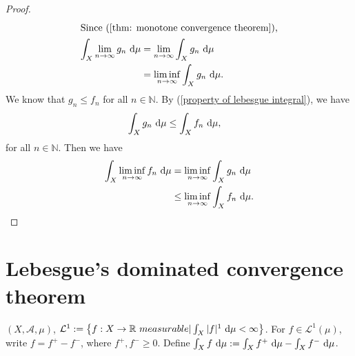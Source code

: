 \documentclass[../../note.tex]{subfiles}
\begin{document}
\begin{proof}
    \begin{align}
        \shortintertext{Since (\ref{thm: monotone convergence theorem}),}
        \int_X \lim_{n \rightarrow \infty}g_n~{\rm d}\mu 
        &= \lim_{n \rightarrow \infty} \int_X g_n~{\rm d}\mu \\
        &= \liminf_{n \rightarrow \infty} \int_X g_n~{\rm d}\mu.
    \end{align}
    We know that $g_n \leq f_n$ for all $n \in \mathbb{N}$. By (\ref{property of lebesgue integral}), we have
    \begin{align}
        \int_X g_n~{\rm d}\mu
        &\leq \int_X f_n~{\rm d}\mu,
    \end{align}
    for all $n \in \mathbb{N}$. Then we have
    \begin{align}
        \int_X \liminf_{n \rightarrow \infty} f_n~{\rm d}\mu
        &= \liminf_{n \rightarrow \infty} \int_X g_n~{\rm d}\mu \\
        &\leq \liminf_{n \rightarrow \infty} \int_X f_n~{\rm d}\mu.
    \end{align}
\end{proof}

\section{Lebesgue's dominated convergence theorem}
$(X, \mathcal{A}, \mu)$, $\mathcal{L}^1:= \left\{f: X \rightarrow \mathbb{R}~measurable \vert \int_X \vert f \vert^1~{\rm d}\mu < \infty \right\}$. For $f \in \mathcal{L}^1(\mu)$, write $f = f^+ - f^-$, where $f^+, f^- \geq 0$. Define $\int_X f~{\rm d}\mu:= \int_X f^+~{\rm d}\mu - \int_X f^-~{\rm d}\mu$.
\end{document}
